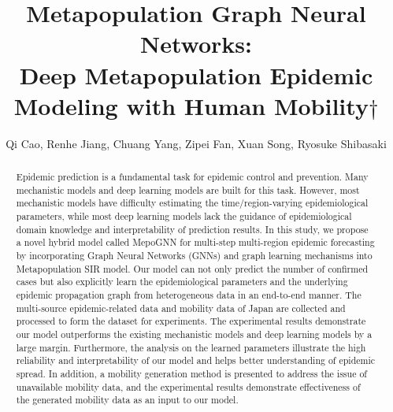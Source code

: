 \documentclass[lettersize,journal]{IEEEtran}
\begin{document}
\title{Metapopulation Graph Neural Networks: \\ Deep Metapopulation Epidemic Modeling with Human Mobility$\dagger$}

\author{Qi Cao, Renhe Jiang, Chuang Yang, Zipei Fan, Xuan Song, Ryosuke Shibasaki
	
}

\maketitle

\begin{abstract}
Epidemic prediction is a fundamental task for epidemic control and prevention. Many mechanistic models and deep learning models are built for this task. However, most mechanistic models have difficulty estimating the time/region-varying epidemiological parameters, while most deep learning models lack the guidance of epidemiological domain knowledge and interpretability of prediction results. In this study, we propose a novel hybrid model called MepoGNN for multi-step multi-region epidemic forecasting by incorporating Graph Neural Networks (GNNs) and graph learning mechanisms into Metapopulation SIR model. Our model can not only predict the number of confirmed cases but also explicitly learn the epidemiological parameters and the underlying epidemic propagation graph from heterogeneous data in an end-to-end manner. The multi-source epidemic-related data and mobility data of Japan are collected and processed to form the dataset for experiments. The experimental results demonstrate our model outperforms the existing mechanistic models and deep learning models by a large margin. Furthermore, the analysis on the learned parameters illustrate the high reliability and interpretability of our model and helps better understanding of epidemic spread. In addition, a mobility generation method is presented to address the issue of unavailable mobility data, and the experimental results demonstrate effectiveness of the generated mobility data as an input to our model.
\end{abstract}
\end{document}
